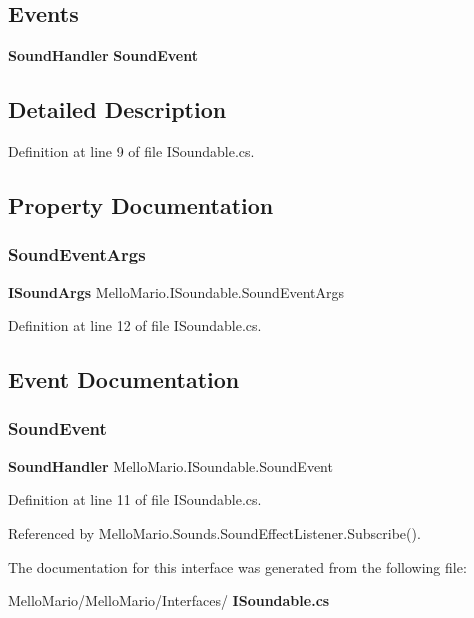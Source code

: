 \subsection*{Events}
\begin{DoxyCompactItemize}
\item 
\textbf{ Sound\+Handler} \textbf{ Sound\+Event}
\end{DoxyCompactItemize}


\subsection{Detailed Description}


Definition at line 9 of file I\+Soundable.\+cs.



\subsection{Property Documentation}
\mbox{\label{interfaceMelloMario_1_1ISoundable_af9186b7c72716a0ffca78360e8d492b0}} 
\subsubsection{Sound\+Event\+Args}
{\footnotesize\ttfamily \textbf{ I\+Sound\+Args} Mello\+Mario.\+I\+Soundable.\+Sound\+Event\+Args\hspace{0.3cm}{\ttfamily [get]}}



Definition at line 12 of file I\+Soundable.\+cs.



\subsection{Event Documentation}
\mbox{\label{interfaceMelloMario_1_1ISoundable_a4340332d6c8957fcc799c96700c4af7d}} 
\subsubsection{Sound\+Event}
{\footnotesize\ttfamily \textbf{ Sound\+Handler} Mello\+Mario.\+I\+Soundable.\+Sound\+Event}



Definition at line 11 of file I\+Soundable.\+cs.



Referenced by Mello\+Mario.\+Sounds.\+Sound\+Effect\+Listener.\+Subscribe().



The documentation for this interface was generated from the following file\+:\begin{DoxyCompactItemize}
\item 
Mello\+Mario/\+Mello\+Mario/\+Interfaces/\textbf{ I\+Soundable.\+cs}\end{DoxyCompactItemize}
